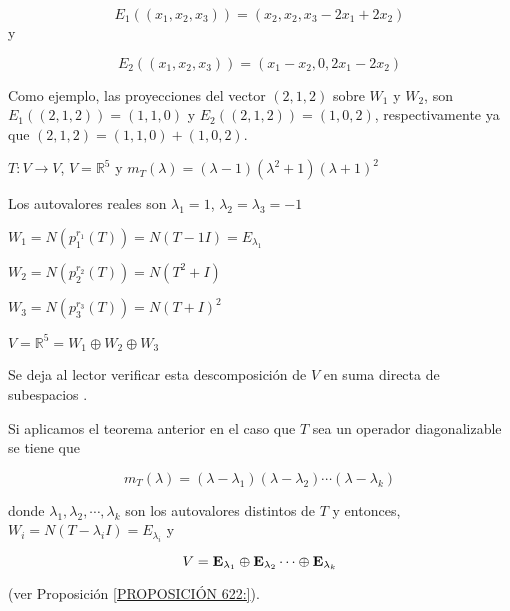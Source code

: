 \begin{example}
$$E_1((x_1,x_2,x_3))=  (x_2,x_2, x_3-2x_1+2x_2)$$
\noindent
y 

$$E_2((x_1,x_2,x_3))=  (x_1-x_2,0, 2x_1-2x_2)$$

\bigskip

\noindent
Como ejemplo, las proyecciones  del vector $(2,1,2)$  sobre $W_1$ y $W_2$, son $E_1((2,1,2)) =(1,1,0)$  y $E_2((2,1,2))=(1,0,2)$, respectivamente ya que  $(2,1,2)=  (1,1,0) +  (1,0,2)$.

\end{example}

\bigskip




\begin{example}

\bigskip

 $T: V \rightarrow V$,  $V=\mathbb{R}^{5}$  y   $m_T(\lambda)=  (\lambda-1)(\lambda^{2}+1) (\lambda+1)^{2}$

\bigskip

Los autovalores reales son $\lambda_1=1$, $\lambda_2=\lambda_3=-1$

\bigskip

$W_1=N(p_1^{r_1}(T))=N(T-1I)=E_{\lambda_1}$

\bigskip

$W_2=N(p_2^{r_2}(T))=N(T^2+I)$





\bigskip

$W_3=N(p_3^{r_3}(T))=N(T+I)^2$

\bigskip

 $V=\mathbb{R}^{5}=W_1 \oplus W_2 \oplus W_3$

 \bigskip

 Se deja al lector verificar esta descomposición de $V$ en suma directa de subespacios .

\end{example}

\bigskip

\begin{remark}  

Si aplicamos el teorema anterior en el caso que $T$ sea un operador diagonalizable se tiene que 


$$m_T(\lambda)=(\lambda-\lambda_1) (\lambda-\lambda_2)\cdots(\lambda-\lambda_k)$$

\noindent
 donde $\lambda_1,\lambda_2, \cdots,\lambda_k$ son los autovalores distintos de $T$ y entonces, $W_i=N(T-\lambda_i I )=E_{\lambda_i}$
y

$$V=\bold E_{\lambda_1} \oplus \bold E_{\lambda_2} \cdots  \oplus \bold E_{\lambda_k}$$

\bigskip


(ver Proposición \ref{PROPOSICIÓN 622:}).
\end{remark}


